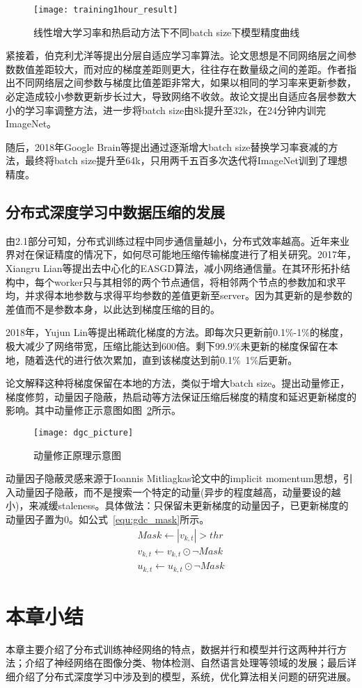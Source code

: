 \begin{figure}[htp]
\centering
\texttt{[image: training1hour\_result]}
\caption{线性增大学习率和热启动方法下不同batch size下模型精度曲线}
\label{fig:training1hour_result}
\end{figure}
紧接着，伯克利尤洋等提出分层自适应学习率算法。论文思想是不同网络层之间参数数值差距较大，而对应的梯度差距则更大，往往存在数量级之间的差距。作者指出不同网络层之间参数与梯度比值差距非常大，如果以相同的学习率来更新参数，必定造成较小参数更新步长过大，导致网络不收敛。故论文提出自适应各层参数大小的学习率调整方法，进一步将batch size由8k提升至32k，在24分钟内训完ImageNet。

随后，2018年Google Brain等提出通过逐渐增大batch size替换学习率衰减的方法，最终将batch size提升至64k，只用两千五百多次迭代将ImageNet训到了理想精度。

\subsection{分布式深度学习中数据压缩的发展}
由2.1部分可知，分布式训练过程中同步通信量越小，分布式效率越高。近年来业界对在保证精度的情况下，如何尽可能地压缩传输梯度进行了相关研究。2017年，Xiangru Lian等提出去中心化的EASGD算法，减小网络通信量。在其环形拓扑结构中，每个worker只与其相邻的两个节点通信，将相邻两个节点的参数加和求平均，并求得本地参数与求得平均参数的差值更新至server。因为其更新的是参数的差值而不是参数本身，以此达到梯度压缩的目的。

2018年，Yujun Lin等提出稀疏化梯度的方法。即每次只更新前0.1\%-1\%的梯度，极大减少了网络带宽，压缩比能达到600倍。剩下99.9\%未更新的梯度保留在本地，随着迭代的进行依次累加，直到该梯度达到前0.1\%~1\%后更新。


论文解释这种将梯度保留在本地的方法，类似于增大batch size。提出动量修正，梯度修剪，动量因子隐蔽，热启动等方法保证压缩后梯度的精度和延迟更新梯度的影响。其中动量修正示意图如图~\ref{fig:dgc_picture}所示。
\begin{figure}[htp]
\centering
\texttt{[image: dgc\_picture]}
\caption{动量修正原理示意图}
\label{fig:dgc_picture}
\end{figure}

动量因子隐蔽灵感来源于Ioannis Mitliagkas论文中的implicit momentum思想，引入动量因子隐蔽，而不是搜索一个特定的动量(异步的程度越高，动量要设的越小)，来减缓staleness。具体做法：只保留未更新梯度的动量因子，已更新梯度的动量因子置为0。如公式~\ref{equ:gdc_mask}所示。
\begin{equation}
\label{equ:gdc_mask}
\begin{split}
Mask\leftarrow |v_{k,t}|>thr \\
v_{k,t}\leftarrow v_{k,t}\odot ¬Mask \\
u_{k,t}\leftarrow u_{k,t}\odot¬Mask
\end{split}
\end{equation}

\section{本章小结}
本章主要介绍了分布式训练神经网络的特点，数据并行和模型并行这两种并行方法；介绍了神经网络在图像分类、物体检测、自然语言处理等领域的发展；最后详细介绍了分布式深度学习中涉及到的模型，系统，优化算法相关问题的研究进展。




